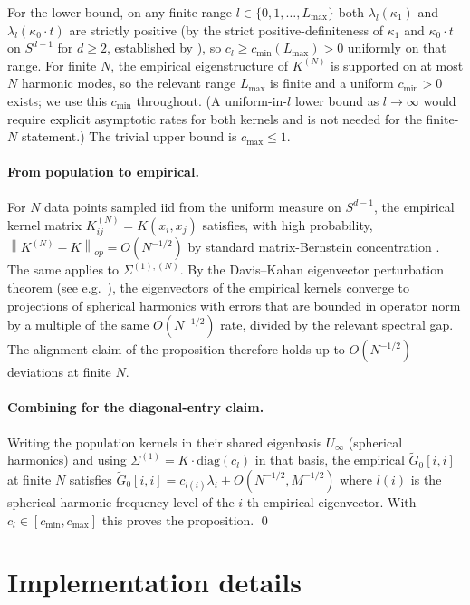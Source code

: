 \documentclass{article}
\newcommand{\norm}[1]{\left\|#1\right\|}
\newcommand{\Gtilde}{\widetilde{G}}
\begin{document}
For the lower bound, on any finite range $l \in \{0, 1, \ldots, L_{\max}\}$
both $\lambda_l(\kappa_1)$ and $\lambda_l(\kappa_0 \cdot t)$ are strictly
positive (by the strict positive-definiteness of $\kappa_1$ and
$\kappa_0 \cdot t$ on $S^{d-1}$ for $d \geq 2$, established by
\citet{bach2017breaking}), so $c_l \geq c_{\min}(L_{\max}) > 0$ uniformly
on that range. For finite $N$, the empirical eigenstructure of $K^{(N)}$
is supported on at most $N$ harmonic modes, so the relevant range
$L_{\max}$ is finite and a uniform $c_{\min} > 0$ exists; we use this
$c_{\min}$ throughout. (A uniform-in-$l$ lower bound as $l \to \infty$
would require explicit asymptotic rates for both kernels and is not
needed for the finite-$N$ statement.) The trivial upper bound is
$c_{\max} \leq 1$.

\paragraph{From population to empirical.}
For $N$ data points sampled iid from the uniform measure on $S^{d-1}$,
the empirical kernel matrix $K^{(N)}_{ij} = K(x_i, x_j)$ satisfies, with
high probability, $\norm{K^{(N)} - K}_{op} = O(N^{-1/2})$ by standard
matrix-Bernstein concentration \citep{tropp2015introduction}. The same
applies to $\Sigma^{(1),(N)}$. By the Davis--Kahan eigenvector perturbation
theorem (see e.g.\ \citealp{stewart1990matrix}), the eigenvectors of the
empirical kernels converge to projections of spherical harmonics with
errors that are bounded in operator norm by a multiple of the same
$O(N^{-1/2})$ rate, divided by the relevant spectral gap. The alignment
claim of the proposition therefore holds up to $O(N^{-1/2})$ deviations
at finite $N$.

\paragraph{Combining for the diagonal-entry claim.}
Writing the population kernels in their shared eigenbasis $U_\infty$
(spherical harmonics) and using $\Sigma^{(1)} = K \cdot \mathrm{diag}(c_l)$
in that basis, the empirical $\Gtilde_0[i,i]$ at finite $N$ satisfies
$\Gtilde_0[i,i] = c_{l(i)} \lambda_i + O(N^{-1/2}, M^{-1/2})$ where
$l(i)$ is the spherical-harmonic frequency level of the $i$-th
empirical eigenvector. With $c_l \in [c_{\min}, c_{\max}]$ this proves
the proposition. \qed

\section{Implementation details}
\label{app:impl}
\end{document}
